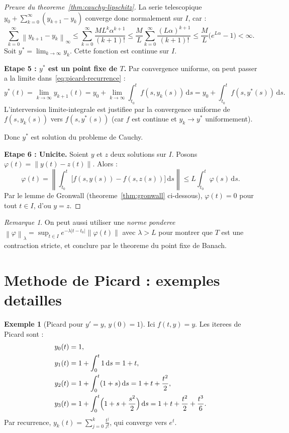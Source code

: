 \documentclass[12pt,a4paper,openany]{book}
\theoremstyle{definition}
\newtheorem{exemple}[definition]{Exemple}
\theoremstyle{plain}
\theoremstyle{remark}
\newtheorem{remarque}[definition]{Remarque}
\newcommand{\dd}{\mathrm{d}}
\newcommand{\abs}[1]{\left|#1\right|}
\newcommand{\norm}[1]{\left\|#1\right\|}
\begin{document}
\begin{proof}[Preuve du theoreme~\ref{thm:cauchy-lipschitz}]
La serie telescopique $y_0 + \sum_{k=0}^{\infty} (y_{k+1} - y_k)$ converge donc normalement sur $I$, car :
\[
  \sum_{k=0}^{\infty} \norm{y_{k+1} - y_k}_\infty \leq \sum_{k=0}^{\infty} \frac{M L^k \alpha^{k+1}}{(k+1)!} \leq \frac{M}{L} \sum_{k=0}^{\infty} \frac{(L\alpha)^{k+1}}{(k+1)!} \leq \frac{M}{L}\bigl(e^{L\alpha} - 1\bigr) < \infty.
\]
Soit $y^* = \lim_{k \to \infty} y_k$. Cette fonction est continue sur $I$.

\medskip
\textbf{Etape 5 : $y^*$ est un point fixe de $T$.}
Par convergence uniforme, on peut passer a la limite dans~\eqref{eq:picard-recurrence} :
\[
  y^*(t) = \lim_{k \to \infty} y_{k+1}(t) = y_0 + \lim_{k \to \infty} \int_{t_0}^{t} f(s, y_k(s))\, \dd s = y_0 + \int_{t_0}^{t} f(s, y^*(s))\, \dd s.
\]
L'interversion limite-integrale est justifiee par la convergence uniforme de $f(s, y_k(s))$ vers $f(s, y^*(s))$ (car $f$ est continue et $y_k \to y^*$ uniformement).

Donc $y^*$ est solution du probleme de Cauchy.

\medskip
\textbf{Etape 6 : Unicite.}
Soient $y$ et $z$ deux solutions sur $I$. Posons $\varphi(t) = \norm{y(t) - z(t)}$. Alors :
\[
  \varphi(t) = \norm{\int_{t_0}^{t} \bigl[f(s, y(s)) - f(s, z(s))\bigr]\, \dd s} \leq L \int_{t_0}^{t} \varphi(s)\, \dd s.
\]
Par le lemme de Gronwall (theoreme~\ref{thm:gronwall} ci-dessous), $\varphi(t) = 0$ pour tout $t \in I$, d'ou $y = z$.
\end{proof}

\begin{remarque}\label{rem:norme-ponderee}
On peut aussi utiliser une \emph{norme ponderee} $\norm{\varphi}_\lambda = \sup_{t \in I} e^{-\lambda\abs{t-t_0}} \norm{\varphi(t)}$ avec $\lambda > L$ pour montrer que $T$ est une contraction stricte, et conclure par le theoreme du point fixe de Banach.
\end{remarque}

\section{Methode de Picard : exemples detailles}\label{sec:picard-exemples}

\begin{exemple}[Picard pour $y' = y$, $y(0) = 1$]\label{ex:picard-exp}
Ici $f(t,y) = y$. Les iterees de Picard sont :
\begin{align*}
y_0(t) &= 1, \\
y_1(t) &= 1 + \int_0^t 1\, \dd s = 1 + t, \\
y_2(t) &= 1 + \int_0^t (1+s)\, \dd s = 1 + t + \frac{t^2}{2}, \\
y_3(t) &= 1 + \int_0^t \Bigl(1 + s + \frac{s^2}{2}\Bigr)\, \dd s = 1 + t + \frac{t^2}{2} + \frac{t^3}{6}.
\end{align*}
Par recurrence, $y_k(t) = \sum_{j=0}^{k} \frac{t^j}{j!}$, qui converge vers $e^t$.
\end{exemple}
\end{document}
